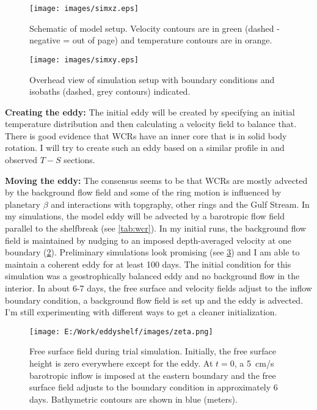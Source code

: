 \begin{figure}[h]
    \centering
    \texttt{[image: images/simxz.eps]}
    		\caption{Schematic of model setup. Velocity contours are in green (dashed - negative = out of page) and temperature contours are in orange.}
    \label{fig:simxz}
\end{figure}

\begin{figure}[h]  
    \centering
    \texttt{[image: images/simxy.eps]}
    \caption{Overhead view of simulation setup with boundary conditions and isobaths (dashed, grey contours) indicated.}
    \label{fig:simxy}
\end{figure}

\textbf{Creating the eddy: }The initial eddy will be created by specifying an initial temperature distribution and then calculating a velocity field to balance that. There is good evidence \citep[e.g.\ ][]{Joyce1984,Wei2008} that WCRs have an inner core that is in solid body rotation. I will try to create such an eddy based on a similar profile in \cite{Katsman2003} and observed $T-S$ sections.

\textbf{Moving the eddy: }The consensus seems to be that WCRs are mostly advected by the background flow field \citep{Churchill1986,Joyce1992} and some of the ring motion is influenced by planetary $β$ and interactions with topgraphy, other rings and the Gulf Stream. In my simulations, the model eddy will be advected by a barotropic flow field parallel to the shelfbreak (see \cref{tab:wcr}). In my initial runs, the background flow field is maintained by nudging to an imposed depth-averaged velocity at one boundary (\cref{fig:simxy}).  Preliminary simulations look promising (see \cref{fig:simout}) and I am able to maintain a coherent eddy for at least 100 days. The initial condition for this simulation was a geostrophically balanced eddy and no background flow in the interior. In about 6-7 days, the free surface and velocity fields adjust to the inflow boundary condition, a background flow field is set up and the eddy is advected. I’m still experimenting with different ways to get a cleaner initialization.
\begin{figure}[h]
    \centering
    \texttt{[image: E:/Work/eddyshelf/images/zeta.png]}
    \caption{Free surface field during trial simulation. Initially, the free surface height is zero everywhere except for the eddy. At $t=0$, a \SI{5}{\cm/\s} barotropic inflow is imposed at the eastern boundary and the free surface field adjusts to the boundary condition in approximately 6 days. Bathymetric contours are shown in blue (meters).}
    \label{fig:simout}
\end{figure}

